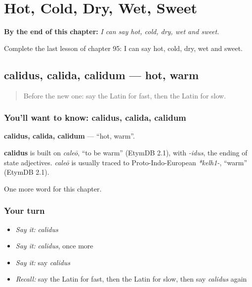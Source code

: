 
\chapter{Hot, Cold, Dry, Wet, Sweet}
\label{ch:la-hot-cold-dry-wet-sweet}

\begin{chapteropening}
\textbf{By the end of this chapter:} \emph{I can say hot, cold, dry, wet and sweet.}

Complete the last lesson of chapter 95: I can say hot, cold, dry, wet and sweet.
\end{chapteropening}

\section[calidus, calida, calidum]{calidus, calida, calidum — hot, warm}

\label{lesson:LA-C95-calidus}



\begin{quote}
Before the new one: say the Latin for fast, then the Latin for slow.
\end{quote}

\subsection*{You'll want to know: calidus, calida, calidum}
\textbf{calidus, calida, calidum} — \textquotedblleft{}hot, warm\textquotedblright{}.

\begin{cousinweb}
\textbf{calidus} is built on \emph{caleō}, \textquotedblleft{}to be warm\textquotedblright{} (EtymDB 2.1), with \emph{-idus}, the ending of state adjectives. \emph{caleō} is usually traced to Proto-Indo-European \emph{*kelh1-}, \textquotedblleft{}warm\textquotedblright{} (EtymDB 2.1).
\end{cousinweb}

\begin{grammarlens}[title={What you've built}]
One more word for this chapter.
\end{grammarlens}

\subsection*{Your turn}
\begin{itemize}
\raggedright
  \item \emph{Say it:} \emph{calidus}
  \item \emph{Say it:} \emph{calidus}, once more
  \item \emph{Say it:} say \emph{calidus}
  \item \emph{Recall:} say the Latin for fast, then the Latin for slow, then say \emph{calidus} again
\end{itemize}

